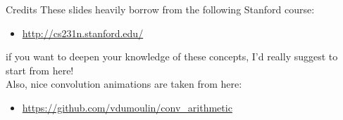 \begin{frame}{Credits}
These slides heavily borrow from the following Stanford course:
\begin{itemize}
\item \url{http://cs231n.stanford.edu/}
\end{itemize}
if you want to deepen your knowledge of these concepts, I'd really suggest to start from here!\\
\vspace{0.2cm}
Also, nice convolution animations are taken from here:
\begin{itemize}
\item \url{https://github.com/vdumoulin/conv_arithmetic}
\end{itemize}
\end{frame}